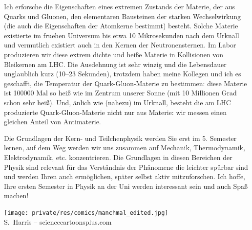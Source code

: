 \begin{multicols}{2}
Ich erforsche die Eigenschaften eines extremen Zustands der Materie, der aus Quarks und Gluonen, den elementaren Bausteinen der starken Wechselwirkung (die auch die Eigenschaften der Atomkerne bestimmt) besteht. Solche Materie existierte im fruehen Universum bis etwa 10 Mikrosekunden nach dem Urknall und vermutlich existiert auch in den Kernen der Neutronensternen. Im Labor produzieren wir diese extrem dichte und heiße Materie in Kollisionen von Bleikernen am LHC. Die Ausdehnung ist sehr winzig und die Lebensdauer unglaublich kurz (10--23 Sekunden), trotzdem haben meine Kollegen und ich es geschafft, die Temperatur der Quark-Gluon-Materie zu bestimmen: diese Materie ist 100000 Mal so heiß wie im
Zentrum unserer Sonne (mit 10 Millionen Grad schon sehr heiß). Und, änlich wie (nahezu) im Urknall, besteht die am LHC produzierte Quark-Gluon-Materie nicht nur aus Materie: wir messen einen gleichen Anteil von Antimaterie.

Die Grundlagen der Kern- und Teilchenphysik werden Sie erst im 5. Semester lernen, auf dem Weg werden wir uns zusammen auf Mechanik, Thermodynamik, Elektrodynamik, etc. konzentrieren. Die Grundlagen in diesen Bereichen der Physik sind relevant für das Verständnis der Phänomene die leichter spürbar sind und werden Ihren auch ermöglichen, später selbst aktiv mitzuforschen. Ich hoffe, Ihre ersten Semester in Physik an der Uni werden interessant sein und auch Spaß machen!

\begin{center}
\texttt{[image: private/res/comics/manchmal\_edited.jpg]}\\
{\footnotesize 
S.~Harris – sciencecartoonsplus.com}
\end{center}

\end{multicols}

\vfill

\newpage

\vspace*{\fill}

